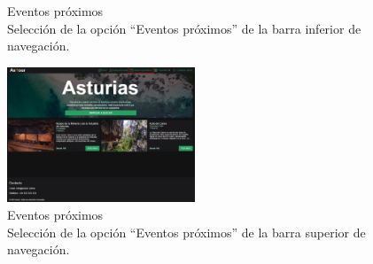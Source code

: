 \begin{figure}[H]
\begin{minipage}{0.45\textwidth}
		\caption{Eventos próximos \\ Selección de la opción “Eventos próximos” de la barra inferior de navegación.}
		\label{fig:eventos-proximos-opcion-app}
	\end{minipage}
\end{figure}

\begin{figure}[H]
	\centering
	\includegraphics[width=0.5\textwidth]{7-Construccion/Manuales/web/next events opcion.png}
	\caption{Eventos próximos \\ Selección de la opción “Eventos próximos” de la barra superior de navegación.}
	\label{fig:eventos-proximos-opcion-web}
\end{figure}

